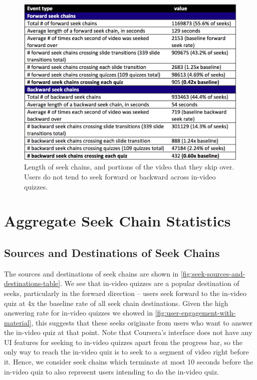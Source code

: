 \documentclass{sigchi}
\begin{document}
\begin{figure}
\includegraphics[width=1.0\columnwidth]{table-of-seeks}
\caption{Length of seek chains, and portions of the video that they skip over. Users do not tend to seek forward or backward across in-video quizzes.}
\label{fig:table-of-seeks}
\end{figure}

\section{Aggregate Seek Chain Statistics}

\subsection{Sources and Destinations of Seek Chains}

The sources and destinations of seek chains are shown in \autoref{fig:seek-sources-and-destinations-table}. We see that in-video quizzes are a popular destination of seeks, particularly in the forward direction -- users seek forward to the in-video quiz at 4x the baseline rate of all seek chain destinations. Given the high answering rate for in-video quizzes we showed in \autoref{fig:user-engagement-with-material}, this suggests that these seeks originate from users who want to answer the in-video quiz at that point. Note that Coursera's interface does not have any UI features for seeking to in-video quizzes apart from the progress bar, so the only way to reach the in-video quiz is to seek to a segment of video right before it. Hence, we consider seek chains which terminate at most 10 seconds before the in-video quiz to also represent users intending to do the in-video quiz.
\end{document}
